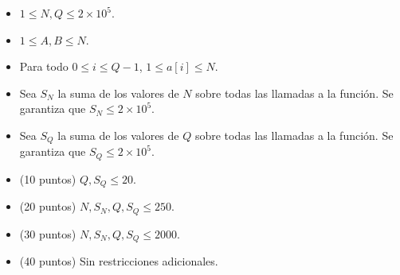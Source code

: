 \documentclass[12pt]{scrartcl}
\begin{document}
        \begin{itemize}
            \item $1 \le  N, Q \le 2\times 10^5$.
            \item $1 \le A, B \le N$.
            \item Para todo $0 \le i \le Q - 1$, $1 \le a[i] \le N$.
            \item Sea $S_N$ la suma de los valores de $N$ sobre todas las llamadas a la función. Se garantiza que $S_N \le 2\times10^5$.
            \item Sea $S_Q$ la suma de los valores de $Q$ sobre todas las llamadas a la función. Se garantiza que $S_Q \le 2\times10^5$.
        \end{itemize}
    

    \begin{itemize}
        \item (10 puntos) $Q, S_Q \le 20$.
        \item (20 puntos) $N, S_N, Q, S_Q \le 250$.
        \item (30 puntos) $N, S_N, Q, S_Q \le 2000$.
        \item (40 puntos) Sin restricciones adicionales.
    \end{itemize}
\end{document}
